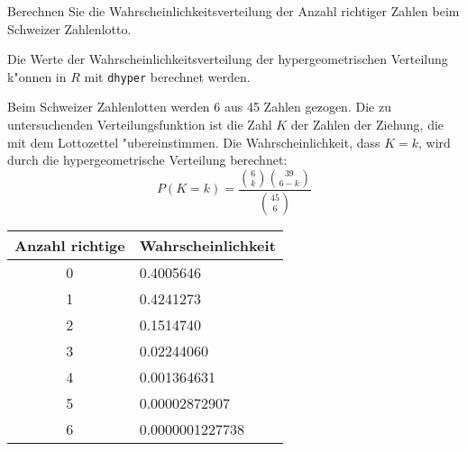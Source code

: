 Berechnen Sie die Wahrscheinlichkeitsverteilung der Anzahl
richtiger Zahlen beim Schweizer Zahlenlotto.

\begin{hinweis}
Die Werte der Wahrscheinlichkeitsverteilung
der hypergeometrischen Verteilung k"onnen
in $R$ mit {\tt dhyper} berechnet werden.
\end{hinweis}

\begin{loesung}
Beim Schweizer Zahlenlotten werden 6 aus 45 Zahlen
gezogen. Die zu untersuchenden Verteilungsfunktion ist die
Zahl $K$ der Zahlen der Ziehung, die mit dem Lottozettel
"ubereinstimmen.
Die Wahrscheinlichkeit, dass $K=k$,
wird durch die hypergeometrische Verteilung berechnet:
\[
P(K=k)=\frac{\binom{6}{k}\binom{39}{6-k}}{\binom{45}{6}}
\]
\begin{center}
\begin{tabular}{|c|l|}
\hline
Anzahl richtige&Wahrscheinlichkeit\\
\hline
0& 0.4005646\\
1& 0.4241273\\
2& 0.1514740\\
3& 0.02244060\\
4& 0.001364631\\
5& 0.00002872907\\
6& 0.0000001227738\\
\hline
\end{tabular}
\end{center}
\end{loesung}

